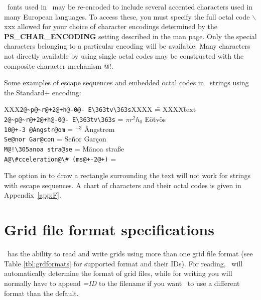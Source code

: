 \PS\ fonts used in \GMT\ may be re-encoded to include
several accented characters used in many European languages.  To
access these, you must specify the full octal code $\backslash$xxx
allowed for your choice of character encodings
determined by the \textbf{PS\_CHAR\_ENCODING} setting described
in the  man page.  Only the special characters
belonging to a particular encoding will
be available.  Many characters not directly available by
using single octal codes may be constructed with the composite
character mechanism @!.
 
Some examples of escape sequences and embedded octal codes in \GMT\ strings using the
Standard+ encoding: 

\begin{tabbing}
XXX\=\verb|2@~p@~r@+2@+h@-0@- E\363tv\363s|XXXX \== XXXX\=text \kill 
\>\verb|2@~p@~r@+2@+h@-0@- E\363tv\363s| \> = $\pi r^2h_0$ E\"{o}tv\"{o}s \\ 
\>\verb|10@+-3 @Angstr@om|		 \> =	$^{-3}$ \AA ngstr\o m \\ 
\>\verb|Se@nor Gar@con|	 \> = \> Se\~{n}or Gar\c{c}on \\ 
\>\verb|M@!\305anoa stra@se|	 \> = \> M\={a}noa stra\ss e \\ 
\>\verb|A@\#cceleration@\# (ms@+-2@+)|	 \> = \> 
\end{tabbing} 

The option in  to draw a rectangle surrounding the text
will not work for strings with escape sequences.  A chart of characters
and their octal codes is given in Appendix~\ref{app:F}. 

\section{Grid file format specifications}
\label{sec:grdformats}
\GMT\ has the ability to read and write grids using more than one grid file
format (see Table \ref{tbl:grdformats} for supported format and their IDs).  For
reading, \GMT\ will automatically determine the format of grid files, while for writing
you will normally have to append \emph{=ID} to the filename if you want \GMT\ to use a different format
than the default.


